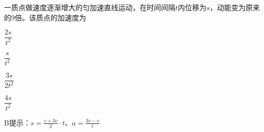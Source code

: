 一质点做速度逐渐增大的匀加速直线运动，在时间间隔\(t\)内位移为\(s\)，动能变为原来的9倍。该质点的加速度为\paren[B]
\begin{choices}
	\item\(\dfrac{2s}{t^2}\)
	\item\(\dfrac{s}{t^2}\)
	\item\(\dfrac{3s}{2t^2}\)
	\item\(\dfrac{4s}{t^2}\)
\end{choices}
\begin{answer}
	B\quad 提示：\(s = \frac{v + 3v}{2}\cdot t\)、\(a = \frac{3v - v}{t}\)
\end{answer}